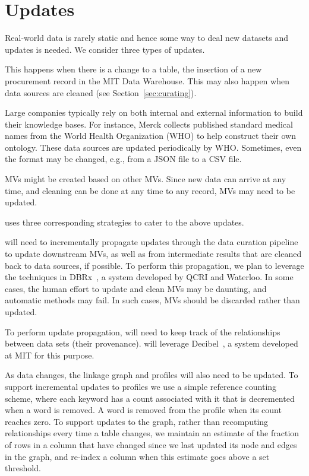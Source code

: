 \vspace{-.1em}
\section{Updates}
\label{sec:updates}

Real-world data is rarely static and hence some way to deal new datasets and updates is needed. We consider three types of updates.

 This happens when there is a
change to a table, \eg the insertion of a new procurement record in the MIT Data
Warehouse. This may also happen when data sources are cleaned (see
Section~\ref{sec:curating}).


 Large companies typically rely on
both internal and external information to build their knowledge bases. For
instance, Merck collects published standard medical names from the World Health
Organization (WHO) to help construct their own ontology. These data sources are
updated periodically by WHO.  Sometimes, even the format may be changed, e.g.,
from a JSON file to a CSV file.


 MVs might be created based on other MVs.  Since
new data can arrive at any time, and cleaning can be done at any time to any record, MVs may need to be
updated.


\dcv uses three corresponding strategies to cater to the above updates.

 \dcv will need to incrementally propagate updates through the data curation pipeline to update downstream MVs, as well as from intermediate results that are cleaned back to data sources, if possible.
To perform this propagation, we plan to leverage the techniques in DBRx~\cite{DBLP:conf/sigmod/ChalamallaIOP14}, a system developed by QCRI and Waterloo.
In some cases, the human effort to update and clean MVs may be daunting, and automatic methods may fail. In such cases, MVs should be discarded rather than updated. 

  To perform update propagation, \dcv will need to keep track of the relationships between data sets (their provenance). \dcv will leverage Decibel~\cite{DBLP:journals/pvldb/MaddoxGEMPD16}, a system developed at MIT for this purpose.

  As data changes, the linkage graph and profiles will also need to be updated.  To support incremental updates  to profiles we  use a simple reference counting scheme, where each keyword has a count associated with it that is decremented when a word is removed.  A word
is removed from the profile when its count reaches zero.  To support updates to the graph, rather than recomputing relationships every time a table changes, we 
maintain an estimate of the fraction of rows in a column that have changed since we last updated its node and edges in the graph, and re-index a column when
this estimate goes above a set threshold.


